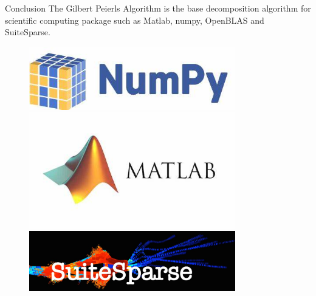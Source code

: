 \documentclass[9pt]{beamer}
\begin{document}
	\begin{frame}{Conclusion}
		The Gilbert Peierls Algorithm is the base decomposition algorithm for scientific computing package such as Matlab, numpy, OpenBLAS and SuiteSparse.
		\begin{figure}[H]
			\centering
			\begin{minipage}[ht]{0.5\linewidth}   
				\centering   
				\includegraphics[width=0.8\textwidth]{figures/numpy.jpeg}
			\end{minipage}
			\begin{minipage}[ht]{0.5\linewidth} %
				\centering
				\includegraphics[width=0.8\textwidth]{figures/matlab.jpeg}
			\end{minipage}
			\begin{minipage}[ht]{0.4\linewidth} %
				\centering
				\includegraphics[width=0.8\textwidth]{figures/SuiteSparse.jpg}
			\end{minipage}
		\end{figure}
	\end{frame}
	
\end{document}

